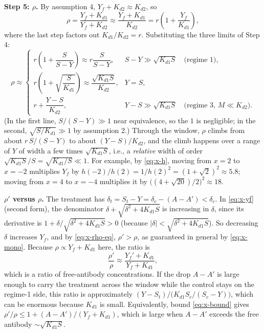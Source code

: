 \textbf{Step 5: $\rho$.} By assumption 4, $Y_f+K_{d2}\approx K_{d2}$, so
\begin{equation}
\rho
=\frac{Y_f+K_{d1}}{Y_f+K_{d2}}
\approx\frac{Y_f+K_{d1}}{K_{d2}}
=r\left(1+\frac{Y_f}{K_{d1}}\right),
\label{eq:x-rho-eq}
\end{equation}
where the last step factors out $K_{d1}/K_{d2}=r$. Substituting the three
limits of Step 4:
$$
\rho\approx
\begin{cases}
r\left(1+\dfrac{S}{S-Y}\right)\approx r\dfrac{S}{S-Y}, & S-Y\gg\sqrt{K_{d1}S}
\quad\text{(regime 1)},\\[2ex]
r\left(1+\sqrt{\dfrac{S}{K_{d1}}}\right)\approx\dfrac{\sqrt{K_{d1}S}}{K_{d2}}, & Y=S,\\[2ex]
r+\dfrac{Y-S}{K_{d2}}, & Y-S\gg\sqrt{K_{d1}S}
\quad\text{(regime 3, }M\ll K_{d2}\text{)}.
\end{cases}
$$
(In the first line, $S/(S-Y)\gg1$ near equivalence, so the $1$ is
negligible; in the second, $\sqrt{S/K_{d1}}\gg1$ by assumption 2.)
Through the window, $\rho$ climbs from about $r\,S/(S-Y)$ to about
$(Y-S)/K_{d2}$, and the climb happens over a range of $Y$ of width a few
times $\sqrt{K_{d1}S}$, i.e., a \emph{relative} width of order
$\sqrt{K_{d1}S}/S=\sqrt{K_{d1}/S}\ll1$. For example, by \eqref{eq:x-h},
moving from $x=2$ to $x=-2$ multiplies $Y_f$ by
$h(-2)/h(2)=1/h(2)^2=(1+\sqrt2)^2\approx5.8$; moving from $x=4$ to $x=-4$
multiplies it by $\bigl((4+\sqrt{20})/2\bigr)^2\approx18$.

\textbf{$\rho'$ versus $\rho$.} The treatment has
$\delta_t=S_t-Y=\delta_c-(A-A')<\delta_c$. In \eqref{eq:x-yf} (second
form), the denominator $\delta+\sqrt{\delta^2+4K_{d1}S}$ is increasing in
$\delta$, since its derivative is
$1+\delta/\sqrt{\delta^2+4K_{d1}S}>0$ (because
$|\delta|<\sqrt{\delta^2+4K_{d1}S}$). So decreasing $\delta$ increases
$Y_f$, and by \eqref{eq:x-rho-eq}, $\rho'>\rho$, as guaranteed in general by
\eqref{eq:x-mono}. Because $\rho\propto Y_f+K_{d1}$ here, the ratio is
$$
\frac{\rho'}{\rho}\approx\frac{Y_f'+K_{d1}}{Y_f+K_{d1}},
$$
which is a ratio of free-antibody concentrations. If the drop $A-A'$ is
large enough to carry the treatment across the window while the control
stays on the regime-1 side, this ratio is approximately
$(Y-S_t)\big/\bigl(K_{d1}S_c/(S_c-Y)\bigr)$, which can be enormous because
$K_{d1}$ is small. Equivalently, bound \eqref{eq:x-bound} gives
$\rho'/\rho\le1+(A-A')/(Y_f+K_{d1})$, which is large when $A-A'$ exceeds
the free antibody $\sim\sqrt{K_{d1}S}$.

